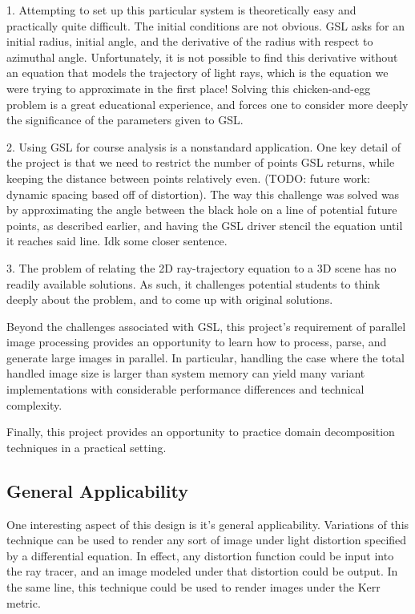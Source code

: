 1. Attempting to set up this particular system is theoretically easy and practically quite difficult. The initial conditions are not obvious. GSL asks for an initial radius, initial angle, and the derivative of the radius with respect to azimuthal angle. Unfortunately, it is not possible to find this derivative without an equation that models the trajectory of light rays, which is the equation we were trying to approximate in the first place! Solving this chicken-and-egg problem is a great educational experience, and forces one to consider more deeply the significance of the parameters given to GSL. 

2. Using GSL for course analysis is a nonstandard application. One key detail of the project is that we need to restrict the number of points GSL returns, while keeping the distance between points relatively even. (TODO: future work: dynamic spacing based off of distortion). The way this challenge was solved was by approximating the angle between the black hole on a line of potential future points, as described earlier, and having the GSL driver stencil the equation until it reaches said line. Idk some closer sentence.

3. The problem of relating the 2D ray-trajectory equation to a 3D scene has no readily available solutions. As such, it challenges potential students to think deeply about the problem, and to come up with original solutions.

Beyond the challenges associated with GSL, this project's requirement of parallel image processing provides an opportunity to learn how to process, parse, and generate large images in parallel. In particular, handling the case where the total handled image size is larger than system memory can yield many variant implementations with considerable performance differences and technical complexity. 

Finally, this project provides an opportunity to practice domain decomposition techniques in a practical setting. %


\subsection{General Applicability}
One interesting aspect of this design is it's general applicability. Variations of this technique can be used to render any sort of image under light distortion specified by a differential equation. In effect, any distortion function could be input into the ray tracer, and an image modeled under that distortion could be output. In the same line, this technique could be used to render images under the Kerr metric.


